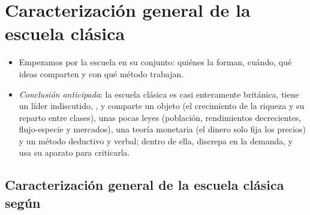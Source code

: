 \documentclass[11pt]{article}
\begin{document}
\section{Caracterización general de la escuela clásica}\label{sec:caracterizacion}

\begin{itemize}
\item Empezamos por la escuela en su conjunto: quiénes la forman, cuándo, qué ideas comparten y con qué método trabajan.
\item \emph{Conclusión anticipada}: la escuela clásica es casi enteramente británica, tiene un líder indiscutido, , y comparte un objeto (el crecimiento de la riqueza y su reparto entre clases), unas pocas leyes (población, rendimientos decrecientes, flujo-especie y mercados), una teoría monetaria (el dinero solo fija los precios) y un método deductivo y verbal; dentro de ella,  discrepa en la demanda, y  usa su aparato para criticarla.
\end{itemize}

\subsection{Caracterización general de la escuela clásica según }\label{sec:schumpeter}
\end{document}

